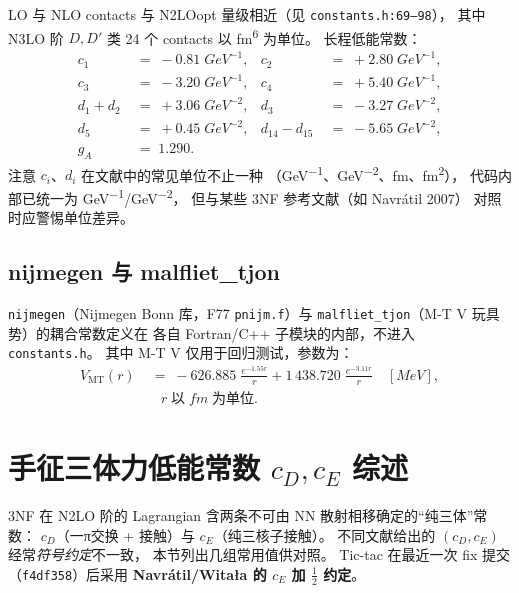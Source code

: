 LO 与 NLO contacts 与 N2LOopt 量级相近（见
\texttt{constants.h:69–98}），
其中 N3LO 阶 $D, D'$ 类 24 个 contacts 以 \si{fm^6} 为单位。
长程低能常数：
\begin{align}
c_1 &\;=\; -0.81\;\si{GeV^{-1}}, &
c_2 &\;=\; +2.80\;\si{GeV^{-1}}, \\
c_3 &\;=\; -3.20\;\si{GeV^{-1}}, &
c_4 &\;=\; +5.40\;\si{GeV^{-1}}, \\
d_1 + d_2 &\;=\; +3.06\;\si{GeV^{-2}}, &
d_3       &\;=\; -3.27\;\si{GeV^{-2}}, \\
d_5       &\;=\; +0.45\;\si{GeV^{-2}}, &
d_{14} - d_{15} &\;=\; -5.65\;\si{GeV^{-2}}, \\
g_A       &\;=\; 1.290.
\end{align}
注意 $c_i$、$d_i$ 在文献中的常见单位不止一种
（\si{GeV^{-1}}、\si{GeV^{-2}}、\si{fm}、\si{fm^2}），
代码内部已统一为 \si{GeV^{-1}}/\si{GeV^{-2}}，
但与某些 3NF 参考文献（如 Navrátil 2007\cite{Navratil2007}）
对照时应警惕单位差异。

\subsection{nijmegen 与 malfliet\_tjon}

\texttt{nijmegen}（Nijmegen Bonn 库，F77 \texttt{pnijm.f}）与
\texttt{malfliet\_tjon}（M-T V 玩具势）的耦合常数定义在
各自 Fortran/C++ 子模块的内部，不进入 \texttt{constants.h}。
其中 M-T V 仅用于回归测试，参数为：
\begin{align}
V_{\text{MT}}(r) &\;=\; -626.885\;\frac{e^{-1.55 r}}{r}
                       + 1\,438.720\;\frac{e^{-3.11 r}}{r}\quad [\si{MeV}],\\
&\quad r\;\text{以}\;\si{fm}\;\text{为单位}.
\end{align}

\section{手征三体力低能常数 \texorpdfstring{$c_D, c_E$}{cD, cE} 综述}
\label{sec:appA_cD_cE_LECs}

3NF 在 N2LO 阶的 Lagrangian 含两条不可由 NN 散射相移确定的“纯三体”常数：
$c_D$（一π交换 + 接触）与 $c_E$（纯三核子接触）。
不同文献给出的 $(c_D, c_E)$ 经常\emph{符号约定}不一致，
本节列出几组常用值供对照。
Tic-tac 在最近一次 fix 提交（\texttt{f4df358}）后采用
\textbf{Navrátil/Witała 的 $c_E$ 加 $\tfrac{1}{2}$ 约定}。

